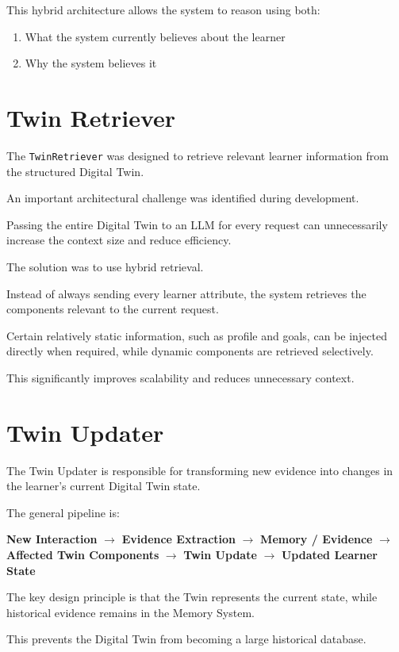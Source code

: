 \documentclass[12pt,a4paper]{article}
\begin{document}
This hybrid architecture allows the system to reason using both:
\begin{enumerate}[noitemsep,topsep=2pt]
    \item What the system currently believes about the learner
    \item Why the system believes it
\end{enumerate}

\section{Twin Retriever}
The \texttt{TwinRetriever} was designed to retrieve relevant learner information from the structured Digital Twin.

An important architectural challenge was identified during development.

Passing the entire Digital Twin to an LLM for every request can unnecessarily increase the context size and reduce efficiency.

The solution was to use hybrid retrieval.

Instead of always sending every learner attribute, the system retrieves the components relevant to the current request.

Certain relatively static information, such as profile and goals, can be injected directly when required, while dynamic components are retrieved selectively.

This significantly improves scalability and reduces unnecessary context.

\section{Twin Updater}
The Twin Updater is responsible for transforming new evidence into changes in the learner's current Digital Twin state.

The general pipeline is:
\begin{center}
\textbf{New Interaction} $\rightarrow$ \textbf{Evidence Extraction} $\rightarrow$ \textbf{Memory / Evidence} $\rightarrow$ \textbf{Affected Twin Components} $\rightarrow$ \textbf{Twin Update} $\rightarrow$ \textbf{Updated Learner State}
\end{center}

The key design principle is that the Twin represents the current state, while historical evidence remains in the Memory System.

This prevents the Digital Twin from becoming a large historical database.
\end{document}
